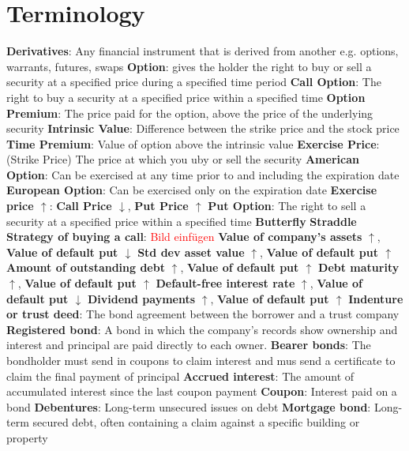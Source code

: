 \documentclass{cheatsheet}
\author{ehaller, seyohnp}
\begin{document}
\section*{Terminology}
    \textbf{Derivatives}: Any financial instrument that is derived from another e.g. options, warrants, futures, swaps
    \textbf{Option}: gives the holder the right to buy or sell a security at a specified price during a specified time period       
    \textbf{Call Option}: The right to buy a security at a specified price within a specified time
    \textbf{Option Premium}: The price paid for the option, above the price of the underlying security
    \textbf{Intrinsic Value}: Difference between the strike price and the stock price
    \textbf{Time Premium}: Value of option above the intrinsic value
    \textbf{Exercise Price}: (Strike Price) The price at which you uby or sell the security
    \textbf{American Option}: Can be exercised at any time prior to and including the expiration date
    \textbf{European Option}: Can be exercised only on the expiration date
    \textbf{Exercise price $\uparrow$}: \textbf{Call Price $\downarrow$}, \textbf{Put Price $\uparrow$} 
    \textbf{Put Option}: The right to sell a security at a specified price within a specified time
    \textbf{Butterfly}
    \textbf{Straddle}
    \textbf{Strategy of buying a call}: \textcolor{red}{Bild einfügen}
    \textbf{Value of company's assets} \textbf{$\uparrow$}, \textbf{Value of default put $\downarrow$}
    \textbf{Std dev asset value} \textbf{$\uparrow$}, \textbf{Value of default put $\uparrow$}
    \textbf{Amount of outstanding debt} \textbf{$\uparrow$}, \textbf{Value of default put $\uparrow$}
    \textbf{Debt maturity} \textbf{$\uparrow$}, \textbf{Value of default put $\uparrow$}
    \textbf{Default-free interest rate} \textbf{$\uparrow$}, \textbf{Value of default put $\downarrow$}
    \textbf{Dividend payments} \textbf{$\uparrow$}, \textbf{Value of default put $\uparrow$}
    \textbf{Indenture or trust deed}: The bond agreement between the borrower and a trust company
    \textbf{Registered bond}: A bond in which the company's records show ownership and interest and principal are paid directly to each owner.
    \textbf{Bearer bonds}: The bondholder must send in coupons to claim interest and mus send a certificate to claim the final payment of principal
    \textbf{Accrued interest}: The amount of accumulated interest since the last coupon payment
    \textbf{Coupon}: Interest paid on a bond
    \textbf{Debentures}: Long-term unsecured issues on debt
    \textbf{Mortgage bond}: Long-term secured debt, often containing a claim against a specific building or property
\end{document}
